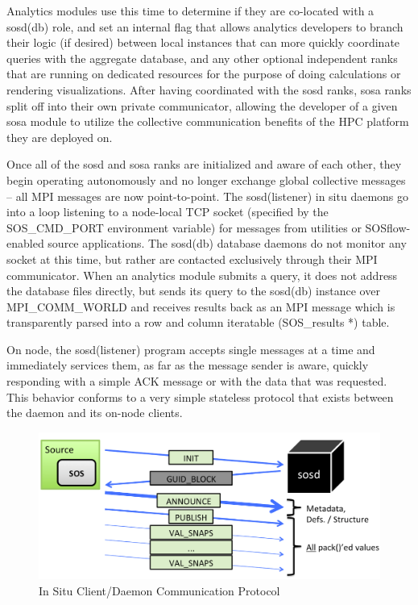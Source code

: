Analytics modules use this time to determine if they are co-located
with a sosd(db) role, and set an internal flag that allows analytics
developers to branch their logic (if desired) between local instances that
can more quickly coordinate queries with the aggregate database, and any 
other optional independent ranks that are running on dedicated resources
for the purpose of doing calculations or rendering visualizations.
%
After having coordinated with the sosd ranks, sosa ranks split off
into their own private communicator, allowing the developer of a given
sosa module to utilize the collective communication benefits of the
HPC platform they are deployed on.

Once all of the sosd and sosa ranks are initialized and aware of each
other, they begin operating autonomously and no longer exchange global
collective messages -- all MPI messages are now point-to-point.
%
The sosd(listener) in situ daemons go into a loop listening to a
node-local TCP socket (specified by the SOS\_CMD\_PORT environment
variable) for messages from utilities or SOSflow-enabled source
applications.
%
The sosd(db) database daemons do not monitor any socket at this time,
but rather are contacted exclusively through their MPI communicator.
%
When an analytics module submits a query, it does not address the
database files directly, but sends its query to the sosd(db) instance
over MPI\_COMM\_WORLD and receives results back as an MPI message
which is transparently parsed into a row and column iteratable
(SOS\_results *) table.

On node, the sosd(listener) program accepts single messages at a time
and immediately services them, as far as the message sender is aware,
quickly responding with a simple ACK message or with the data that was
requested.  This behavior conforms to a very simple stateless protocol
that exists between the daemon and its on-node clients.

\begin{figure}[!t]
\centering
\includegraphics[width=5in]{images/sosd_protocol.png}
\caption{In Situ Client/Daemon Communication Protocol}
\label{fig_sim}
\end{figure}

